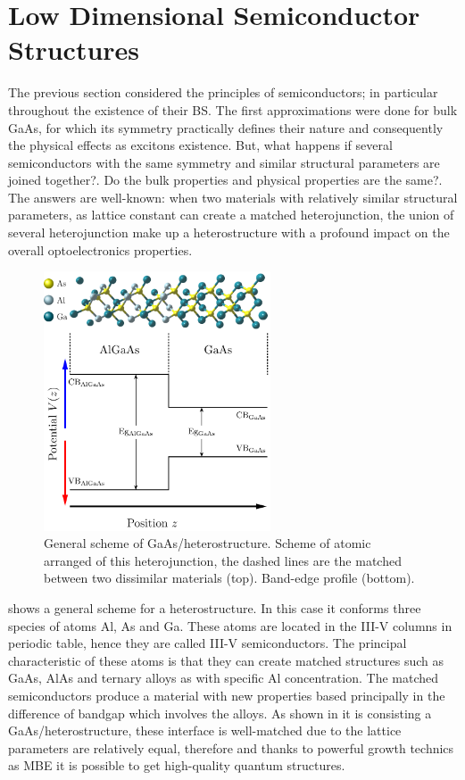 \section{Low Dimensional Semiconductor Structures}
\label{sec:chapter-1-low-dimensional-structures}
\vspace{-10mm} 
The previous section considered the principles of semiconductors; in particular throughout the existence of their \gls{BS}. The first approximations were done for bulk GaAs, for which its symmetry practically defines their nature and consequently the physical effects as excitons existence.  But, what happens  if several semiconductors with the same symmetry and similar structural parameters are joined together?. Do the bulk properties and physical properties are the same?. 
The answers  are well-known: when two materials with relatively similar structural parameters, as lattice constant can create a matched heterojunction, the union of several heterojunction make up a heterostructure with a profound impact on the overall optoelectronics properties.\\
\begin{figure}[ht!]
	\centering
	\includegraphics[width=0.6\textwidth]{../figures/chapter-1/heterostructures/build-ruco/hs-01}
	\caption{General scheme of GaAs/\algaas heterostructure. Scheme of atomic arranged of this heterojunction, the dashed lines are the matched between two dissimilar
	materials (top). Band-edge profile (bottom).}
	\label{fig:subsection-1.2-heterostructure}
\end{figure}
 shows  a general scheme for a heterostructure. In this case it conforms three species of atoms Al, As and Ga. These atoms are located in the III-V columns in periodic table, hence they are called III-V semiconductors. The principal characteristic of these atoms is that they can create matched structures such as GaAs, AlAs and ternary alloys as \algaas with specific Al concentration. The matched semiconductors produce a material with new properties based principally in the difference of bandgap which involves the alloys. 
As shown in  it is consisting a GaAs/\algaas heterostructure, these interface is well-matched due to the lattice parameters are relatively equal, therefore and thanks to powerful growth technics as MBE it is possible to get high-quality quantum structures. 

